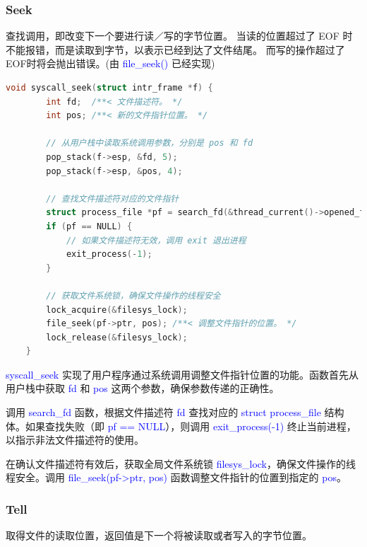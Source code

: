 \documentclass[14pt,a4paper,UTF8,twoside]{article}
\renewcommand{\texttt}[1]{\textcolor{blue}{\ttfamily #1}}
\begin{document}
\subsubsection{Seek}

查找调用，即改变下一个要进行读／写的字节位置。
当读的位置超过了 EOF 时不能报错，而是读取到字节，以表示已经到达了文件结尾。
而写的操作超过了 EOF时将会抛出错误。(由 \texttt{file\_seek()} 已经实现)

\begin{lstlisting}[language=C, title= syscall\_seek()]
    void syscall_seek(struct intr_frame *f) {
        int fd;  /**< 文件描述符。 */
        int pos; /**< 新的文件指针位置。 */
    
        // 从用户栈中读取系统调用参数，分别是 pos 和 fd
        pop_stack(f->esp, &fd, 5);
        pop_stack(f->esp, &pos, 4);
    
        // 查找文件描述符对应的文件指针
        struct process_file *pf = search_fd(&thread_current()->opened_files, fd);
        if (pf == NULL) {
            // 如果文件描述符无效，调用 exit 退出进程
            exit_process(-1);
        }
    
        // 获取文件系统锁，确保文件操作的线程安全
        lock_acquire(&filesys_lock);
        file_seek(pf->ptr, pos); /**< 调整文件指针的位置。 */
        lock_release(&filesys_lock);
    }
    \end{lstlisting}
    
    \begin{ctt}
    \texttt{syscall\_seek} 实现了用户程序通过系统调用调整文件指针位置的功能。函数首先从用户栈中获取 \texttt{fd} 和 \texttt{pos} 这两个参数，确保参数传递的正确性。
    
    调用 \texttt{search\_fd} 函数，根据文件描述符 \texttt{fd} 查找对应的 \texttt{struct process\_file} 结构体。如果查找失败（即 \texttt{pf == NULL}），则调用 \texttt{exit\_process(-1)} 终止当前进程，以指示非法文件描述符的使用。
    
    在确认文件描述符有效后，获取全局文件系统锁 \texttt{filesys\_lock}，确保文件操作的线程安全。调用 \texttt{file\_seek(pf->ptr, pos)} 函数调整文件指针的位置到指定的 \texttt{pos}。
    \end{ctt}

\subsubsection{Tell}

取得文件的读取位置，返回值是下一个将被读取或者写入的字节位置。
\end{document}
